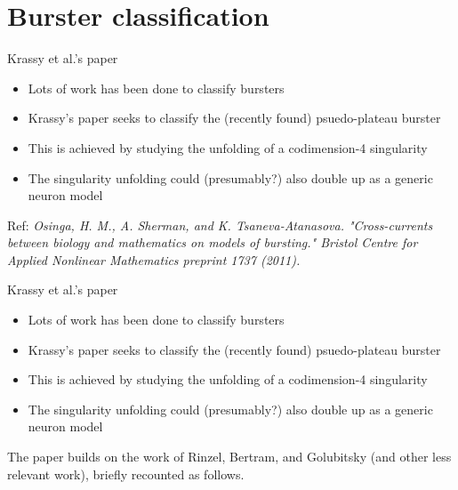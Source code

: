 \documentclass{beamer}
\begin{document}
\section{Burster classification}
\label{sec:orga2a64a4}
\begin{frame}[label={sec:org44f1e3d}]{Krassy et al.'s paper}
\begin{itemize}
\item Lots of work has been done to classify bursters
\item Krassy's paper seeks to classify the (recently found) psuedo-plateau burster
\item This is achieved by studying the unfolding of a codimension-4 singularity
\item The singularity unfolding could (presumably?) also double up as a generic neuron model
\end{itemize}

Ref: \emph{Osinga, H. M., A. Sherman, and K. Tsaneva-Atanasova. "Cross-currents between biology and mathematics on models of bursting." Bristol Centre for Applied Nonlinear Mathematics preprint 1737 (2011).}
\end{frame}

\begin{frame}[label={sec:org99410d5}]{Krassy et al.'s paper}
\begin{itemize}
\item Lots of work has been done to classify bursters
\item Krassy's paper seeks to classify the (recently found) psuedo-plateau burster
\item This is achieved by studying the unfolding of a codimension-4 singularity
\item The singularity unfolding could (presumably?) also double up as a generic neuron model
\end{itemize}


The paper builds on the work of Rinzel, Bertram, and Golubitsky (and other less relevant work), briefly recounted as follows.
\end{frame}
\end{document}
